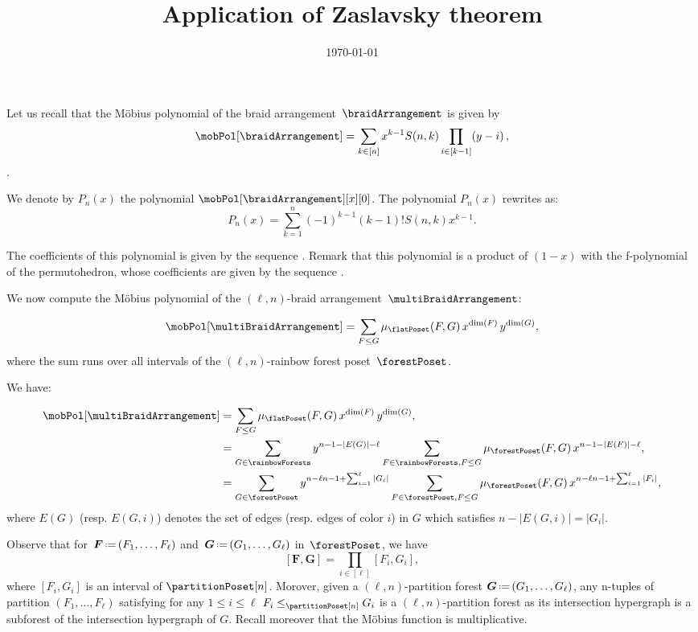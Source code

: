 \documentclass[11pt,leqno]{amsart}
\title{Application of Zaslavsky theorem}
\author{}
\date{\today}
\newcommand{\OEIS}[1]{\cite[{\rm \href{http://oeis.org/#1}{\texttt{#1}}}]{OEIS}}
\theoremstyle{definition}
\theoremstyle{plain}
\renewcommand{\b}[1]{{\boldsymbol{#1}}} %
\renewcommand{\b}[1]{\boldsymbol{#1}} %
\newcommand{\eqdef}{\mbox{\,\raisebox{0.2ex}{\scriptsize\ensuremath{\mathrm:}}\ensuremath{=}\,}} %
\begin{document}
\maketitle

Let us recall that the M\"obius polynomial of the braid arrangement~$\braidArrangement$ is given by
\[
\mobPol[\braidArrangement] = \sum_{k \in [n]} x^{k-1} S(n,k) \prod_{i \in [k-1]} (y-i) \, ,
\].

We denote by $P_n(x)$ the polynomial $\mobPol[\braidArrangement][x][0]$. The polynomial $P_n(x)$ rewrites as:
\begin{equation*}
P_n(x)=\sum_{k=1}^n (-1)^{k-1} (k-1)! S(n,k) x^{k-1}. 
\end{equation*}

The coefficients of this polynomial is given by the sequence \OEIS{A028246}. Remark that this polynomial is a product of $(1-x)$ with the f-polynomial of the permutohedron, whose coefficients are given by the sequence \OEIS{A019538}. 

We now compute the M\"obius polynomial of the $(\ell,n)$-braid arrangement~$\multiBraidArrangement$:

\begin{equation*}
\mobPol[\multiBraidArrangement] =\sum_{F \leq G} \mu_{\flatPoset}(F,G) \, x^{\dim(F)} \, y^{\dim(G)},
\end{equation*}
where the sum runs over all intervals of the $(\ell,n)$-rainbow forest poset~$\forestPoset$.

We have:

\begin{align*}
\mobPol[\multiBraidArrangement] & =\sum_{F \leq G} \mu_{\flatPoset}(F,G) \, x^{\dim(F)} \, y^{\dim(G)}, \\
 &=\sum_{G \in \rainbowForests} y^{n-1 - |E(G)| - \ell} \sum_{F \in \rainbowForests, F \leq G } \mu_{\forestPoset}(F,G) \, x^{n-1 - |E(F)| - \ell}, \\
 &=\sum_{G \in \forestPoset} y^{n-\ell n - 1 + \sum_{i=1}^\ell |G_i|} \sum_{F \in \forestPoset, F \leq G } \mu_{\forestPoset}(F,G) \, x^{n-\ell n - 1 + \sum_{i=1}^\ell |F_i|}, \\ 
\end{align*}
where $E(G)$ (resp. $E(G,i)$) denotes the set of edges (resp. edges of color $i$) in $G$ which satisfies $n-|E(G,i)| =  |G_i|$.

Observe that for~$\b{F} \eqdef (F_1, \dots, F_\ell)$ and~$\b{G} \eqdef (G_1, \dots, G_\ell)$ in~$\forestPoset$, we have
\[
[\b{F}, \b{G}] = \prod_{i \in [\ell]} [F_i, G_i],
\]
where $[F_i, G_i]$ is an interval of $\partitionPoset[n]$. Morover, given a $(\ell,n)$-partition forest $\b{G}\eqdef (G_1, \dots, G_\ell)$, any n-tuples of partition $(F_1, \dots, F_\ell)$ satisfying for any $1\leq i \leq \ell$ $F_i \leq_{\partitionPoset[n]} G_i $ is a $(\ell,n)$-partition forest as its intersection hypergraph is a subforest of the intersection hypergraph of $G$. 
Recall moreover that the M\"obius function is multiplicative.
\end{document}
